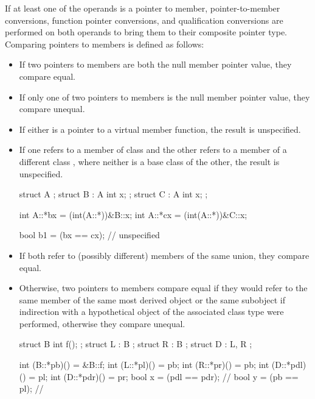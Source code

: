 \pnum
If at least one of the operands is a pointer to member,
pointer-to-member conversions,
function pointer conversions, and
qualification conversions
are performed on both operands to bring them to
their composite pointer type.
Comparing pointers to members is defined as follows:

\begin{itemize}
\item
If two pointers to members are both the null member pointer value, they compare
equal.

\item
If only one of two pointers to members is the null member pointer value, they
compare unequal.

\item
If either is a pointer to a virtual member function, the result is unspecified.

\item
If one refers to a member of class  and the other refers to a member
of a different class , where neither is a base class of the other,
the result is unspecified.
\begin{example}
\begin{codeblock}
struct A {};
struct B : A { int x; };
struct C : A { int x; };

int A::*bx = (int(A::*))&B::x;
int A::*cx = (int(A::*))&C::x;

bool b1 = (bx == cx);   // unspecified
\end{codeblock}
\end{example}

\item
If both refer to (possibly different) members of the same union,
they compare equal.

\item
Otherwise, two pointers to members compare equal if they would refer to the same member of
the same most derived object or the same subobject if
indirection with a hypothetical object of the associated
class type were performed, otherwise they compare unequal.
\begin{example}
\begin{codeblock}
struct B {
  int f();
};
struct L : B { };
struct R : B { };
struct D : L, R { };

int (B::*pb)() = &B::f;
int (L::*pl)() = pb;
int (R::*pr)() = pb;
int (D::*pdl)() = pl;
int (D::*pdr)() = pr;
bool x = (pdl == pdr);          // 
bool y = (pb == pl);            // 
\end{codeblock}
\end{example}
\end{itemize}

